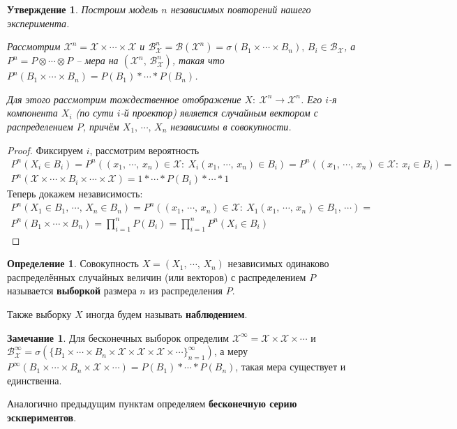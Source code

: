 \documentclass[a4paper,12pt]{article}
\theoremstyle{plain}
\newtheorem{proposition}{Утверждение}[section]
\theoremstyle{definition}
\newtheorem{definition}{Определение}[section]
\newtheorem*{note}{Замечание}
\theoremstyle{remark}
\begin{document}
\begin{proposition}
  Построим модель $n$ независимых повторений нашего эксперимента.

  Рассмотрим $\mathcal{X}^n = \mathcal{X} \times \cdots \times \mathcal{X}$ и $\mathcal{B}_\mathcal{X}^n = \mathcal{B}(\mathcal{X}^n) = \sigma(B_1\times\cdots\times B_n),\, B_i \in \mathcal{B}_{\mathcal{X}}$, а $P^n = P \otimes\cdots\otimes P$ -- мера на $(\mathcal{X}^n,\, \mathcal{B}_\mathcal{X}^n)$, такая что $P^n(B_1\times\cdots\times B_n) = P(B_1)*\cdots* P(B_n)$.

  Для этого рассмотрим тождественное отображение $X :\: \mathcal{X}^n \to \mathcal{X}^n$. Его $i$-я компонента $X_i$ (по сути $i$-й проектор) является случайным вектором с распределением $P$, причём $X_1,\,\cdots,\,X_n$ независимы в совокупности.
\end{proposition}

\begin{proof}
  Фиксируем $i$, рассмотрим вероятность
  \begin{align*}
    P^n(X_i \in B_i) = P^n((x_1,\,\cdots,\,x_n) \in \mathcal{X} :\: X_i(x_1,\,\cdots,\,x_n) \in B_i) =
    P^n((x_1,\,\cdots,\,x_n) \in \mathcal{X} :\: x_i \in B_i) =\\ 
    P^n(\mathcal{X}\times\cdots\times B_i\times\cdots\times \mathcal{X}) = 1*\cdots*P(B_i)*\cdots*1
  \end{align*}
  Теперь докажем независимость:
  \begin{align*}
    P^n(X_1 \in B_1,\,\cdots,\,X_n\in B_n) = P^n((x_1,\,\cdots,\,x_n) \in \mathcal{X} :\: X_1(x_1,\,\cdots,\,x_n) \in B_1,\,\cdots) = \\
    P^n(B_1\times\cdots\times B_n) = \prod_{i = 1}^nP(B_i) = \prod_{i = 1}^nP^n(X_i \in B_i)
  \end{align*}
\end{proof}

\begin{definition}
  Совокупность $X = (X_1,\,\cdots,\,X_n)$ независимых одинаково распределённых случайных величин (или векторов) с распределением $P$ называется \textbf{выборкой} размера $n$ из распределения $P$.

  Также выборку $X$ иногда будем называть \textbf{наблюдением}.
\end{definition}

\begin{note}
  Для бесконечных выборок определим $\mathcal{X}^\infty = \mathcal{X} \times \mathcal{X} \times\cdots$ и $\mathcal{B}_\mathcal{X}^\infty = \sigma(\{B_1\times \cdots\times B_n\times \mathcal{X}\times\mathcal{X}\times\mathcal{X}\times\cdots\}_{n = 1}^\infty)$, а меру $P^\infty(B_1\times\cdots\times B_n\times\mathcal{X}\times\cdots) = P(B_1)*\cdots*P(B_n)$, такая мера существует и единственна.

  Аналогично предыдущим пунктам определяем \textbf{бесконечную серию эскпериментов}.
\end{note}
\end{document}
